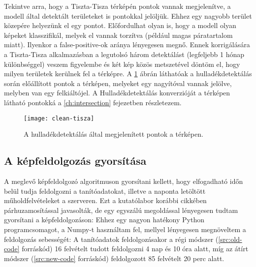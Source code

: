 Tekintve arra, hogy a Tiszta-Tisza térképén pontok vannak megjelenítve, a modell által detektált területeket is pontokkal jelöljük. Ehhez egy nagyobb terület közepére helyezünk el egy pontot. Előfordulhat olyan is, hogy a modell olyan képeket klasszifikál, melyek el vannak torzítva (például magas páratartalom miatt). Ilyenkor a false-positive-ok aránya lényegesen megnő. Ennek korrigálására a Tiszta-Tisza alkalmazásban a legutolsó három detektálást (legfeljebb 1 hónap különbséggel) veszem figyelembe és két kép közös metszetével döntöm el, hogy milyen területek kerülnek fel a térképre. A \ref{fig:clean-tisza} ábrán láthatóak a hulladékdetektálás során előállított pontok a térképen, melyeket egy nagyítóval vannak jelölve, melyben van egy felkiáltójel. A Hulladékdetektálás konverzióját a térképen látható pontokká a \ref{ch:intersection} fejezetben részletezem.

\begin{figure}[H]
	\centering
	\texttt{[image: clean-tisza]}
	\caption{A hulladékdetektálás által megjelenített pontok a térképen.}
    \label{fig:clean-tisza}
\end{figure}

\subsection{A képfeldolgozás gyorsítása}
A meglevő képfeldolgozó algoritmuson gyorsítani kellett, hogy elfogadható időn belül tudja feldolgozni a tanítóadatokat, illetve a naponta letöltött műholdfelvételeket a szerveren. Ezt a kutatólabor korábbi cikkében párhuzamosítással javasolták, de egy egyszálú megoldással lényegesen tudtam gyorsítani a képfeldolgozáson: Ehhez egy nagyon hatékony Python programcsomagot, a Numpy-t \cite{harris2020array} használtam fel, mellyel lényegesen megnöveltem a feldolgozás sebességét: A tanítóadatok feldolgozásakor a régi módszer (\ref{src:old-code} forráskód) 16 felvételt tudott feldolgozni 4 nap és 10 óra alatt, míg az átírt módszer (\ref{src:new-code} forráskód) feldolgozott 85 felvételt 20 perc alatt.

